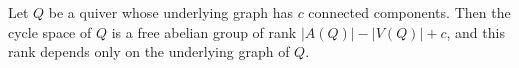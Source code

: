 \begin{theorem}\label{Arden24-thm-3.1}
\label{Arden24-thm:rank}
Let $Q$ be a quiver whose underlying graph has $c$ connected components. Then the cycle space of $Q$ is a free abelian group of rank $|A(Q)| - |V(Q)| + c$, and this rank depends only on the underlying graph of $Q$.
\end{theorem}